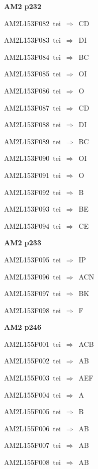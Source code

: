 \par\vfill\eject
{\bf\hfill AM2 p232\hfill\hbox{}}\par\bigskip
{\sixrm AM2L153F082\ {\sixit tei}\ }$\Rightarrow$\ CD\par\smallskip
{\sixrm AM2L153F083\ {\sixit tei}\ }$\Rightarrow$\ DI\par\smallskip
{\sixrm AM2L153F084\ {\sixit tei}\ }$\Rightarrow$\ BC\par\smallskip
{\sixrm AM2L153F085\ {\sixit tei}\ }$\Rightarrow$\ OI\par\smallskip
{\sixrm AM2L153F086\ {\sixit tei}\ }$\Rightarrow$\ {\tenit O}\par\smallskip
{\sixrm AM2L153F087\ {\sixit tei}\ }$\Rightarrow$\ CD\par\smallskip
{\sixrm AM2L153F088\ {\sixit tei}\ }$\Rightarrow$\ DI\par\smallskip
{\sixrm AM2L153F089\ {\sixit tei}\ }$\Rightarrow$\ BC\par\smallskip
{\sixrm AM2L153F090\ {\sixit tei}\ }$\Rightarrow$\ OI\par\smallskip
{\sixrm AM2L153F091\ {\sixit tei}\ }$\Rightarrow$\ O\par\smallskip
{\sixrm AM2L153F092\ {\sixit tei}\ }$\Rightarrow$\ B\par\smallskip
{\sixrm AM2L153F093\ {\sixit tei}\ }$\Rightarrow$\ BE\par\smallskip
{\sixrm AM2L153F094\ {\sixit tei}\ }$\Rightarrow$\ CE\par\smallskip

\par\vfill\eject
{\bf\hfill AM2 p233\hfill\hbox{}}\par\bigskip
{\sixrm AM2L153F095\ {\sixit tei}\ }$\Rightarrow$\ IP\par\smallskip
{\sixrm AM2L153F096\ {\sixit tei}\ }$\Rightarrow$\ ACN\par\smallskip
{\sixrm AM2L153F097\ {\sixit tei}\ }$\Rightarrow$\ BK\par\smallskip
{\sixrm AM2L153F098\ {\sixit tei}\ }$\Rightarrow$\ F\par\smallskip

\par\vfill\eject
{\bf\hfill AM2 p246\hfill\hbox{}}\par\bigskip
{\sixrm AM2L155F001\ {\sixit tei}\ }$\Rightarrow$\ ACB\par\smallskip
{\sixrm AM2L155F002\ {\sixit tei}\ }$\Rightarrow$\ AB\par\smallskip
{\sixrm AM2L155F003\ {\sixit tei}\ }$\Rightarrow$\ AEF\par\smallskip
{\sixrm AM2L155F004\ {\sixit tei}\ }$\Rightarrow$\ A\par\smallskip
{\sixrm AM2L155F005\ {\sixit tei}\ }$\Rightarrow$\ B\par\smallskip
{\sixrm AM2L155F006\ {\sixit tei}\ }$\Rightarrow$\ AB\par\smallskip
{\sixrm AM2L155F007\ {\sixit tei}\ }$\Rightarrow$\ AB\par\smallskip
{\sixrm AM2L155F008\ {\sixit tei}\ }$\Rightarrow$\ AB\par\smallskip

